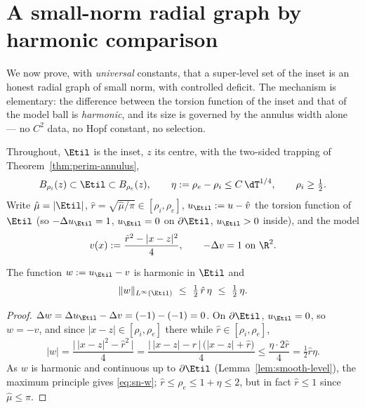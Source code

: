 \section{A small-norm radial graph by harmonic comparison}\label{sec:smallnorm}

We now prove, with \emph{universal} constants, that a super-level set of the
inset is an honest radial graph of small norm, with controlled deficit. The
mechanism is elementary: the difference between the torsion function of the
inset and that of the model ball is \emph{harmonic}, and its size is
governed by the annulus width alone --- no $C^2$ data, no Hopf constant, no
selection.

Throughout, $\Etil$ is the inset, $z$ its centre, with the two-sided
trapping of Theorem~\ref{thm:perim-annulus},
\begin{equation}\label{eq:sn-annulus}
   B_{\rho_i}(z)\subset\Etil\subset B_{\rho_e}(z),\qquad
   \eta:=\rho_e-\rho_i\le C\,\dT^{1/4},\qquad \rho_i\ge\tfrac12 .
\end{equation}
Write $\hat\mu=|\Etil|$, $\hat r=\sqrt{\hat\mu/\pi}\in[\rho_i,\rho_e]$,
$u_{\Etil}:=u-\hat v$ the torsion function of $\Etil$ (so $-\Delta u_{\Etil}
=1$, $u_{\Etil}=0$ on $\partial\Etil$, $u_{\Etil}>0$ inside), and the model
\begin{equation}\label{eq:sn-v}
   v(x):=\frac{\hat r^2-|x-z|^2}{4},\qquad -\Delta v=1\ \text{on }\R^2 .
\end{equation}

\begin{lemma}\label{lem:harm}
The function $w:=u_{\Etil}-v$ is harmonic in $\Etil$ and
\begin{equation}\label{eq:sn-w}
   \|w\|_{L^\infty(\Etil)}\ \le\ \tfrac12\,\hat r\,\eta\ \le\ \tfrac12\,\eta .
\end{equation}
\end{lemma}

\begin{proof}
$\Delta w=\Delta u_{\Etil}-\Delta v=(-1)-(-1)=0$. On $\partial\Etil$,
$u_{\Etil}=0$, so $w=-v$, and since $|x-z|\in[\rho_i,\rho_e]$ there while
$\hat r\in[\rho_i,\rho_e]$,
\[
   |w|=\frac{\bigl|\,|x-z|^2-\hat r^2\,\bigr|}{4}
   =\frac{\bigl|\,|x-z|-\hat r\,\bigr|\,\bigl(|x-z|+\hat r\bigr)}{4}
   \le\frac{\eta\cdot 2\hat r}{4}=\tfrac12\hat r\eta .
\]
As $w$ is harmonic and continuous up to $\partial\Etil$
(Lemma~\ref{lem:smooth-level}), the maximum principle gives
\eqref{eq:sn-w}; $\hat r\le\rho_e\le 1+\eta\le 2$, but in fact
$\hat r\le 1$ since $\hat\mu\le\pi$.
\end{proof}

